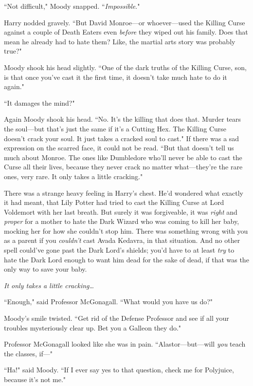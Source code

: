 ``Not difficult," Moody snapped. ``\emph{Impossible}."

Harry nodded gravely. ``But David Monroe—or whoever—used the Killing Curse against a couple of Death Eaters even \emph{before} they wiped out his family. Does that mean he already had to hate them? Like, the martial arts story was probably true?"

Moody shook his head slightly. ``One of the dark truths of the Killing Curse, son, is that once you've cast it the first time, it doesn't take much hate to do it again."

``It damages the mind?"

Again Moody shook his head. ``No. It's the killing that does that. Murder tears the soul—but that's just the same if it's a Cutting Hex. The Killing Curse doesn't crack your soul. It just takes a cracked soul to cast." If there was a sad expression on the scarred face, it could not be read. ``But that doesn't tell us much about Monroe. The ones like Dumbledore who'll never be able to cast the Curse all their lives, because they never crack no matter what—they're the rare ones, very rare. It only takes a little cracking."

There was a strange heavy feeling in Harry's chest. He'd wondered what exactly it had meant, that Lily Potter had tried to cast the Killing Curse at Lord Voldemort with her last breath. But surely it was forgiveable, it was \emph{right} and \emph{proper} for a mother to hate the Dark Wizard who was coming to kill her baby, mocking her for how she couldn't stop him. There was something wrong with you as a parent if you \emph{couldn't} cast Avada Kedavra, in that situation. And no other spell could've gone past the Dark Lord's shields; you'd have to at least \emph{try} to hate the Dark Lord enough to want him dead for the sake of dead, if that was the only way to save your baby.

\emph{It only takes a little cracking{\ldots}}

``Enough," said Professor McGonagall. ``What would you have us do?"

Moody's smile twisted. ``Get rid of the Defense Professor and see if all your troubles mysteriously clear up. Bet you a Galleon they do."

Professor McGonagall looked like she was in pain. ``Alastor—but—will \emph{you} teach the classes, if—"

``Ha!" said Moody. ``If I ever say yes to that question, check me for Polyjuice, because it's not me."

